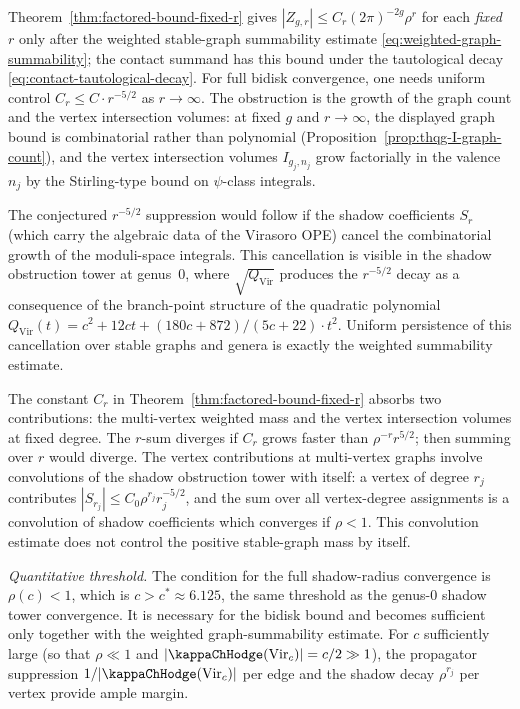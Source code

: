 \begin{remark}
\label{rem:bidisk-obstacle}
Theorem~\ref{thm:factored-bound-fixed-r} gives
$|Z_{g,r}| \leq C_r (2\pi)^{-2g} \rho^r$ for each
\emph{fixed} $r$ only after the weighted stable-graph summability
estimate \eqref{eq:weighted-graph-summability}; the contact summand
has this bound under the tautological decay
\eqref{eq:contact-tautological-decay}. For full bidisk
convergence, one needs uniform control
$C_r \leq C \cdot r^{-5/2}$ as $r \to \infty$. The obstruction is the
growth of the graph count and the vertex intersection volumes: at
fixed $g$ and $r \to \infty$, the displayed graph bound is
combinatorial rather than polynomial
(Proposition~\ref{prop:thqg-I-graph-count}), and the vertex
intersection volumes $I_{g_j, n_j}$ grow factorially in the valence
$n_j$ by the Stirling-type bound on $\psi$-class integrals.

The conjectured $r^{-5/2}$ suppression would follow if the
shadow coefficients $S_r$ (which carry the algebraic data of
the Virasoro OPE) cancel the combinatorial growth of the
moduli-space integrals. This cancellation is visible in the
shadow obstruction tower at genus~$0$, where $\sqrt{Q_{\mathrm{Vir}}}$
produces the $r^{-5/2}$ decay as a consequence of the
branch-point structure of the quadratic polynomial
$Q_{\mathrm{Vir}}(t) = c^2 + 12ct + (180c + 872)/(5c+22)
\cdot t^2$. Uniform persistence of this cancellation over
stable graphs and genera is exactly the weighted summability
estimate.

The constant $C_r$ in
Theorem~\ref{thm:factored-bound-fixed-r} absorbs two
contributions: the multi-vertex weighted mass and the vertex
intersection volumes at fixed degree. The $r$-sum diverges if
$C_r$ grows faster than
$\rho^{-r} r^{5/2}$; then summing over $r$ would diverge.
The vertex contributions at multi-vertex graphs involve convolutions
of the shadow obstruction tower with itself: a
vertex of degree $r_j$ contributes
$|S_{r_j}| \leq C_0 \rho^{r_j} r_j^{-5/2}$, and the sum
over all vertex-degree assignments is a convolution of shadow
coefficients which converges if $\rho < 1$. This convolution estimate
does not control the positive stable-graph mass by itself.

\emph{Quantitative threshold.} The condition for the full
shadow-radius convergence is $\rho(c) < 1$, which is
$c > c^* \approx 6.125$, the same threshold as the genus-$0$ shadow
tower convergence. It is necessary for the bidisk bound and becomes
sufficient only together with the weighted graph-summability estimate.
For $c$ sufficiently large (so that
$\rho \ll 1$ and $|\kappaChHodge(\mathrm{Vir}_c)| = c/2 \gg 1$), the propagator
suppression $1/|\kappaChHodge(\mathrm{Vir}_c)|$ per edge and the shadow decay
$\rho^{r_j}$ per vertex provide ample margin.


\end{remark}
